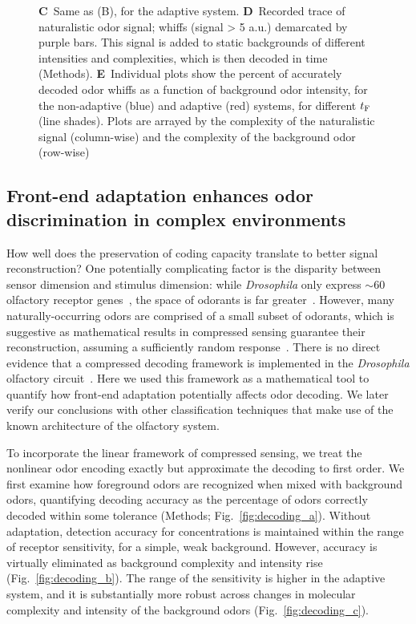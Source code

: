 \documentclass[9pt,twocolumn,twoside,lineno]{pnas-new}
\begin{document}
\begin{figure}[t]
{{    \textbf{C}~Same as (B), for the adaptive system.
    \textbf{D}~Recorded trace of naturalistic odor signal; whiffs (signal > 5 a.u.) demarcated by purple bars. This signal is added to static backgrounds of different intensities and complexities, which is then decoded in time (Methods).
    \textbf{E}~Individual plots show the percent of accurately decoded odor whiffs as a function of background odor intensity, for the non-adaptive (blue) and adaptive (red) systems, for different $t_{\textup F}$ (line shades). Plots are arrayed by the complexity of the naturalistic signal (column-wise) and the complexity of the background odor (row-wise)
    }}
	\label{fig:decoding}
\end{figure}


\subsection*{Front-end adaptation enhances odor discrimination in complex environments}

How well does the preservation of coding capacity translate to better signal reconstruction?
One potentially complicating factor is the disparity between sensor dimension and stimulus dimension: while \textit{Drosophila} only express $\sim 60$ olfactory receptor genes~\cite{olfactory_sensory_map}, the space of odorants is far greater~\cite{vijay_1}. However, many naturally-occurring odors are comprised of a small subset of odorants, which is suggestive as mathematical results in compressed sensing guarantee their reconstruction, assuming a sufficiently random response~\cite{vijay_1, CS_donoho, CS_tao, CS_ganguli}. There is no direct evidence that a compressed decoding framework is implemented in the \textit{Drosophila} olfactory circuit~\cite{chlovskii_pevlavan}. Here we used this framework as a mathematical tool to quantify how front-end adaptation potentially affects odor decoding. We later verify our conclusions with other classification techniques that make use of the known architecture of the olfactory system. 

To incorporate the linear framework of compressed sensing, we treat the nonlinear odor encoding exactly but approximate the decoding to first order. We first examine how foreground odors are recognized when mixed with background odors, quantifying decoding accuracy as the percentage of odors correctly decoded within some tolerance (Methods; Fig.~\ref{fig:decoding_a}). Without adaptation, detection accuracy for concentrations is maintained within the range of receptor sensitivity, for a simple, weak background. However, accuracy is virtually eliminated as background complexity and intensity rise (Fig.~\ref{fig:decoding_b}). The range of the sensitivity is higher in the adaptive system, and it is substantially more robust across changes in molecular complexity and intensity of the background odors (Fig.~\ref{fig:decoding_c}). 
\end{document}
